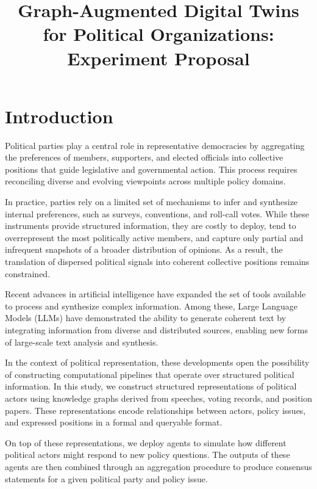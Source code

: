 \documentclass[11pt]{article}
\begin{document}
\title{Graph-Augmented Digital Twins for Political Organizations: Experiment Proposal}
\maketitle

\section{Introduction}

Political parties play a central role in representative democracies by aggregating the preferences of members, supporters, and elected officials into collective positions that guide legislative and governmental action. This process requires reconciling diverse and evolving viewpoints across multiple policy domains.

In practice, parties rely on a limited set of mechanisms to infer and synthesize internal preferences, such as surveys, conventions, and roll-call votes. While these instruments provide structured information, they are costly to deploy, tend to overrepresent the most politically active members, and capture only partial and infrequent snapshots of a broader distribution of opinions. As a result, the translation of dispersed political signals into coherent collective positions remains constrained.

Recent advances in artificial intelligence have expanded the set of tools available to process and synthesize complex information. Among these, Large Language Models (LLMs) have demonstrated the ability to generate coherent text by integrating information from diverse and distributed sources, enabling new forms of large-scale text analysis and synthesis.

In the context of political representation, these developments open the possibility of constructing computational pipelines that operate over structured political information. In this study, we construct structured representations of political actors using knowledge graphs derived from speeches, voting records, and position papers. These representations encode relationships between actors, policy issues, and expressed positions in a formal and queryable format.

On top of these representations, we deploy agents to simulate how different political actors might respond to new policy questions. The outputs of these agents are then combined through an aggregation procedure to produce consensus statements for a given political party and policy issue.
\end{document}
